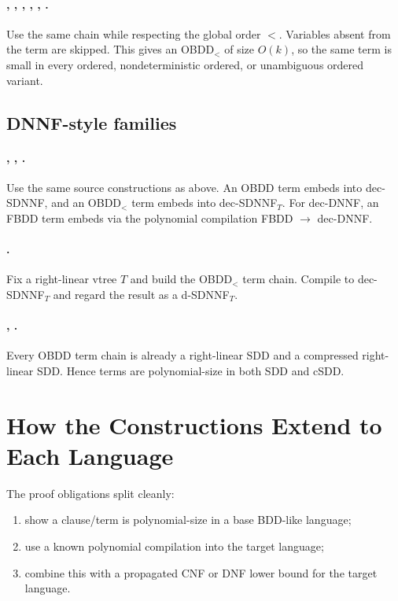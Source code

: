 \documentclass[11pt]{article}
\begin{document}
\paragraph{, , , , , .}
Use the same chain while respecting the global order $<$.
Variables absent from the term are skipped.
This gives an OBDD$_<$ of size $O(k)$, so the same term is small in every ordered, nondeterministic ordered, or unambiguous ordered variant.

\subsection{DNNF-style families}
\paragraph{, , .}
Use the same source constructions as above.
An OBDD term embeds into dec-SDNNF, and an OBDD$_<$ term embeds into dec-SDNNF$_T$.
For dec-DNNF, an FBDD term embeds via the polynomial compilation FBDD $\to$ dec-DNNF.

\paragraph{.}
Fix a right-linear vtree $T$ and build the OBDD$_<$ term chain.
Compile to dec-SDNNF$_T$ and regard the result as a d-SDNNF$_T$.

\paragraph{, .}
Every OBDD term chain is already a right-linear SDD and a compressed right-linear SDD.
Hence terms are polynomial-size in both SDD and cSDD.

\section{How the Constructions Extend to Each Language}
The proof obligations split cleanly:
\begin{enumerate}[noitemsep]
  \item show a clause/term is polynomial-size in a base BDD-like language;
  \item use a known polynomial compilation into the target language;
  \item combine this with a propagated CNF or DNF lower bound for the target language.
\end{enumerate}
\end{document}
